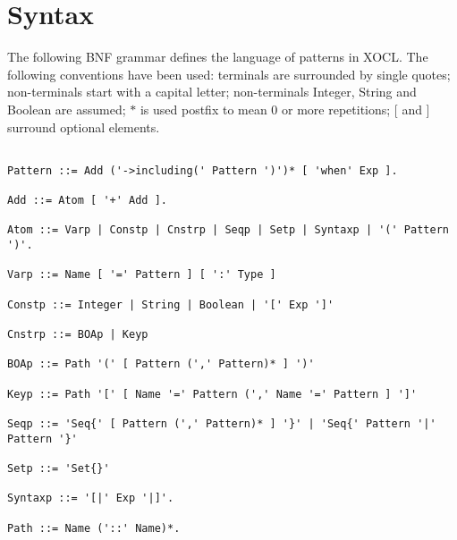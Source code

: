 \documentclass{article}
\begin{document}
\section{Syntax}

The following BNF grammar defines the language of patterns in XOCL. 
The following conventions have been used: terminals are surrounded by single
quotes; non-terminals start with a capital letter; non-terminals Integer,
String and Boolean are assumed; $*$ is used postfix to mean 0 or more 
repetitions; [ and ] surround optional elements.

{\small
\begin{verbatim}

Pattern ::= Add ('->including(' Pattern ')')* [ 'when' Exp ].

Add ::= Atom [ '+' Add ].

Atom ::= Varp | Constp | Cnstrp | Seqp | Setp | Syntaxp | '(' Pattern ')'.

Varp ::= Name [ '=' Pattern ] [ ':' Type ]

Constp ::= Integer | String | Boolean | '[' Exp ']'

Cnstrp ::= BOAp | Keyp

BOAp ::= Path '(' [ Pattern (',' Pattern)* ] ')'

Keyp ::= Path '[' [ Name '=' Pattern (',' Name '=' Pattern ] ']' 

Seqp ::= 'Seq{' [ Pattern (',' Pattern)* ] '}' | 'Seq{' Pattern '|' Pattern '}'

Setp ::= 'Set{}'

Syntaxp ::= '[|' Exp '|]'.

Path ::= Name ('::' Name)*.

\end{verbatim}}
\end{document}
